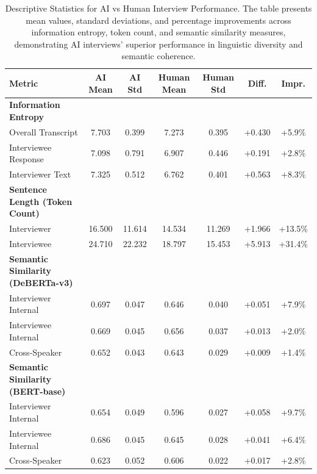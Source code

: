 \documentclass[sigchi,nonacm,manuscript]{acmart}
\begin{document}
\begin{table}[t]
  \centering
\caption{Descriptive Statistics for AI vs Human Interview Performance. The table presents mean values, standard deviations, and percentage improvements across information entropy, token count, and semantic similarity measures, demonstrating AI interviews' superior performance in linguistic diversity and semantic coherence.}
\label{tab:comprehensive_stats}
\small
\begin{tabular}{@{\hspace{0.5em}}l@{\hspace{1em}}c@{\hspace{1em}}c@{\hspace{1em}}c@{\hspace{1em}}c@{\hspace{1em}}c@{\hspace{1em}}c@{\hspace{0.5em}}}
    \toprule
\textbf{Metric} & \textbf{AI Mean} & \textbf{AI Std} & \textbf{Human Mean} & \textbf{Human Std} & \textbf{Diff.} & \textbf{Impr.} \\
    \midrule
\textbf{Information Entropy} & & & & & & \\
\quad Overall Transcript & 7.703 & 0.399 & 7.273 & 0.395 & +0.430 & +5.9\% \\
\quad Interviewee Response & 7.098 & 0.791 & 6.907 & 0.446 & +0.191 & +2.8\% \\
\quad Interviewer Text & 7.325 & 0.512 & 6.762 & 0.401 & +0.563 & +8.3\% \\[0.4em]
\textbf{Sentence Length (Token Count)} & & & & & & \\
\quad Interviewer & 16.500 & 11.614 & 14.534 & 11.269 & +1.966 & +13.5\% \\
\quad Interviewee & 24.710 & 22.232 & 18.797 & 15.453 & +5.913 & +31.4\% \\[0.4em]
\textbf{Semantic Similarity (DeBERTa-v3)} & & & & & & \\
\quad Interviewer Internal & 0.697 & 0.047 & 0.646 & 0.040 & +0.051 & +7.9\% \\
\quad Interviewee Internal & 0.669 & 0.045 & 0.656 & 0.037 & +0.013 & +2.0\% \\
\quad Cross-Speaker & 0.652 & 0.043 & 0.643 & 0.029 & +0.009 & +1.4\% \\[0.4em]
\textbf{Semantic Similarity (BERT-base)} & & & & & & \\
\quad Interviewer Internal & 0.654 & 0.049 & 0.596 & 0.027 & +0.058 & +9.7\% \\
\quad Interviewee Internal & 0.686 & 0.045 & 0.645 & 0.028 & +0.041 & +6.4\% \\
\quad Cross-Speaker & 0.623 & 0.052 & 0.606 & 0.022 & +0.017 & +2.8\% \\
  \bottomrule
\end{tabular}
\end{table}
\end{document}
